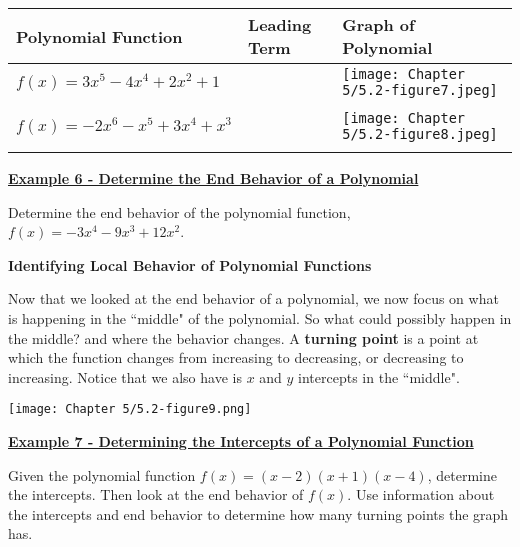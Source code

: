 \documentclass[12pt]{book}
\begin{document}
\newpage

\begin{center}
\renewcommand{\arraystretch}{1.8} %
\begin{tabular}{|m{5cm}|m{4cm}|m{7cm}|}
\hline
Polynomial Function & Leading Term & Graph of Polynomial \\
\hline
$f(x) = 3x^5-4x^4+2x^2+1$ &  & \texttt{[image: Chapter 5/5.2-figure7.jpeg]} \\
 &  &  \\
\hline
$f(x)=-2x^6-x^5+3x^4+x^3$ & & \texttt{[image: Chapter 5/5.2-figure8.jpeg]} \\
&  &  \\
\hline
\end{tabular}
\end{center}


\newpage

















\newpage

\underline{\textbf{Example 6 - Determine the End Behavior of a Polynomial}}

Determine the end behavior of the polynomial function, $f(x)=-3x^4-9x^3+12x^2$.

\vspace{50mm}

{\large \textbf{Identifying Local Behavior of Polynomial Functions}}

Now that we looked at the end behavior of a polynomial, we now focus on what is happening in the ``middle" of the polynomial. So what could possibly happen in the middle?  and where the behavior changes. A \textbf{turning point} is a point at which the function changes from increasing to decreasing, or decreasing to increasing. Notice that we also have is $x$ and $y$ intercepts in the ``middle".
\bigskip

\centerline{\texttt{[image: Chapter 5/5.2-figure9.png]}}




\newpage

\underline{\textbf{Example 7 - Determining the Intercepts of a Polynomial Function}}

Given the polynomial function  $f(x)=(x-2)(x+1)(x-4)$, determine the intercepts. Then look at the end behavior of $f(x)$. Use information about the intercepts and end behavior to determine how many turning points the graph has. 
\end{document}
